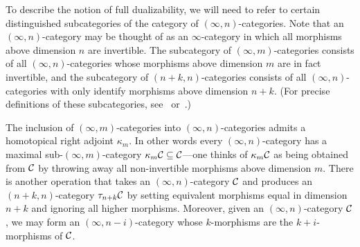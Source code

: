 \documentclass{amsart}
\begin{document}

To describe the notion of full dualizability, we will need to refer to certain distinguished subcategories of the category of $(\infty,n)$-categories.  Note that an $(\infty,n)$-category may be thought of as an $\infty$-category in which all morphisms above dimension $n$ are invertible.  The subcategory of $(\infty,m)$-categories consists of all $(\infty,n)$-categories whose morphisms above dimension $m$ are in fact invertible, and the subcategory of $(n+k,n)$-categories consists of all $(\infty,n)$-categories with only identify morphisms above dimension $n+k$.  (For precise definitions of these subcategories, see~\cite{Rezk} or~\cite{Barwick-SP}.)

The inclusion of $(\infty,m)$-categories into $(\infty, n)$-categories admits a homotopical right adjoint $\kappa_m$. In other words every $(\infty,n)$-category has a maximal sub-$(\infty,m)$-category $\kappa_m \mathcal C \subseteq \mathcal C$---one thinks of $\kappa_m \mathcal C$ as being obtained from $\mathcal C$ by throwing away all non-invertible morphisms above dimension $m$.   There is another operation that takes an $(\infty,n)$-category $\mathcal C$ and produces an $(n+k,n)$-category $\tau_{n+k} \mathcal C$ by setting equivalent morphisms equal in dimension $n+k$ and ignoring all higher morphisms.  Moreover, given an $(\infty,n)$-category $\mathcal C$, we may form an $(\infty,n-i)$-category whose $k$-morphisms are the $k+i$-morphisms of $\mathcal C$.
\end{document}
